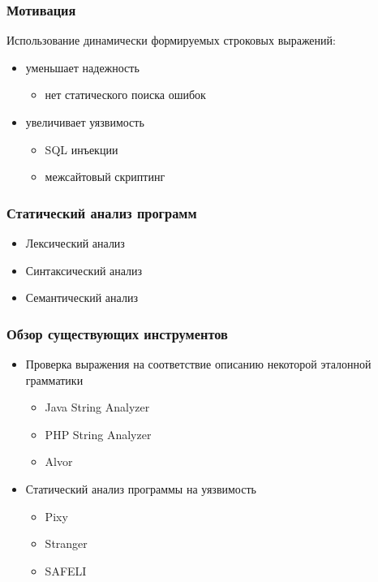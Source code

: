 \documentclass{beamer}
\begin{document}
\begin{frame}
\transwipe[direction=90]
\frametitle{Мотивация}
Использование динамически формируемых строковых выражений:
\begin{itemize}
\item уменьшает надежность
\begin{itemize}
\item нет статического поиска ошибок
\end{itemize}
\item увеличивает уязвимость
\begin{itemize}
\item SQL инъекции
\item межсайтовый скриптинг
\end{itemize}
\end{itemize}
\end{frame}


\begin{frame}
\transwipe[direction=90]
\frametitle{Статический анализ программ}
\begin{itemize}
\item Лексический анализ
\item Синтаксический анализ 
\item Семантический анализ
\end{itemize}

\end{frame}


\begin{frame}
\transwipe[direction=90]
\frametitle{Обзор существующих инструментов}
\begin{itemize}
\item Проверка выражения на соответствие описанию некоторой эталонной грамматики
\begin{itemize}
\item Java String Analyzer
\item PHP String Analyzer
\item Alvor
\end{itemize}

\item Статический анализ программы на уязвимость
\begin{itemize}
\item Pixy
\item Stranger
\item SAFELI
\end{itemize}
\end{itemize}
\end{frame}
\end{document}
